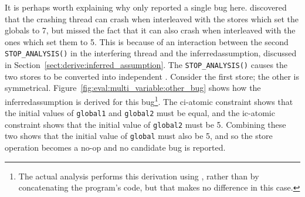 It is perhaps worth explaining why {\technique} only reported a single
bug here.  {\Technique} discovered that the crashing thread can crash
when interleaved with the stores which set the globals to 7, but
missed the fact that it can also crash when interleaved with the ones
which set them to 5.  This is because of an interaction between the
second \texttt{STOP\_ANALYSIS()} in the interfering thread and the
\gls{inferredassumption}, discussed in
Section~\ref{sect:derive:inferred_assumption}.  The
\texttt{STOP\_ANALYSIS()} causes the two stores to be converted into
independent {\StateMachines}.  Consider the first store; the other is
symmetrical.  Figure~\ref{fig:eval:multi_variable:other_bug} shows how
the \gls{inferredassumption} is derived for this bug\footnote{The
  actual analysis performs this derivation using {\StateMachines},
  rather than by concatenating the program's code, but that makes no
  difference in this case.}.  The \gls{ci-atomic} constraint shows
that the initial values of \texttt{global1} and \texttt{global2} must
be equal, and the \gls{ic-atomic} constraint shows that the initial
value of \texttt{global2} must be 5.  Combining these two shows that
the initial value of \texttt{global} must also be 5, and so the store
operation becomes a no-op and no candidate bug is reported.

